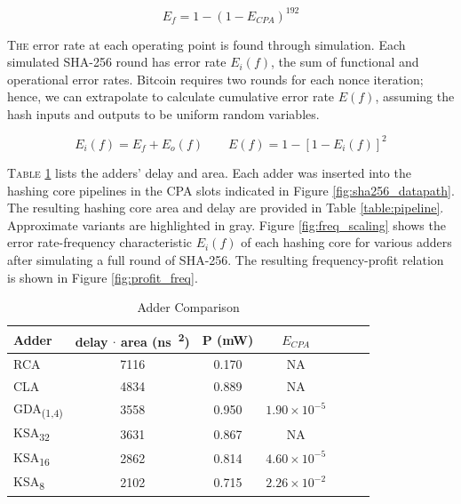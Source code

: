 \documentclass[portrait,a0,final]{a0poster}
\begin{document}
\begin{multicols}{3}
\begin{tcolorbox}[title=Approximate Mining]
\begin{equation}
\label{eq:error_func}
E_f = 1 - (1 - E_{CPA})^{192}
\end{equation}

\lettrine{T}{he} error rate at each operating point is found through simulation. Each simulated SHA-256 round has error rate $E_i(f)$, the sum of functional and operational error rates. Bitcoin requires two rounds for each nonce iteration; hence, we can extrapolate to calculate cumulative error rate $E(f)$, assuming the hash inputs and outputs to be uniform random variables.

\begin{equation}
E_i(f) = E_f + E_o(f) \qquad E(f) = 1 - [1 - E_i(f)]^2
\end{equation}
\end{tcolorbox}

\begin{tcolorbox}[title=Results]
\lettrine{T}{able} \ref{table:adders} lists the adders' delay and area. Each adder was inserted into the hashing core pipelines in the CPA slots indicated in Figure \ref{fig:sha256_datapath}. The resulting hashing core area and delay are provided in Table \ref{table:pipeline}. Approximate variants are highlighted in gray. Figure \ref{fig:freq_scaling} shows the error rate-frequency characteristic $E_i(f)$ of each hashing core for various adders after simulating a full round of SHA-256. The resulting frequency-profit relation is shown in Figure \ref{fig:profit_freq}.
\end{tcolorbox}

\begin{table}[H]
\centering
\caption{Adder Comparison}
\label{table:adders}
\begin{tabular}{l*{5}{c}r}
Adder & delay $\cdot$ area (\si{\nano\second \cdot {\micro\meter}^2}) & P (\si{\milli\watt}) & $E_{CPA}$ \\
\hline
RCA & 7116 & 0.170 & NA \\
CLA & 4834 & 0.889 & NA \\
\rowcolor{gray}
GDA\textsubscript{(1,4)} & 3558 & 0.950 & $1.90 \times 10^{-5}$ \\
KSA\textsubscript{32} & 3631 & 0.867 & NA \\
\rowcolor{gray}
KSA\textsubscript{16} & 2862 & 0.814 & $4.60 \times 10^{-5}$ \\
\rowcolor{gray}
KSA\textsubscript{8} & 2102 & 0.715 & $2.26 \times 10^{-2}$ \\
\end{tabular}


\end{table}
\end{multicols}
\end{document}
